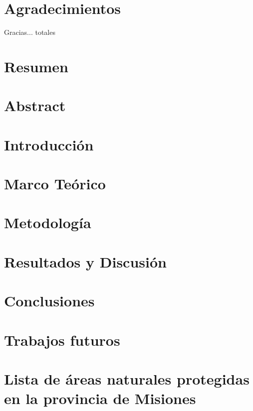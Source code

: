 \documentclass[11pt,a4paper]{report}
\begin{document}
\chapter*{Agradecimientos}
Gracias... totales
\chapter*{Resumen}  %

\chapter*{Abstract} %


\justifying
\setlength{\parindent}{20pt}
\chapter{Introducción}  
    
\chapter{Marco Teórico}
    
\chapter{Metodología}               \label{Metodología}
    
\chapter{Resultados y Discusión}    \label{Resultados}
    
\chapter{Conclusiones}      
    
\chapter{Trabajos futuros}      
    
\appendix
\chapter{Lista de áreas naturales protegidas en la provincia de Misiones} \label{reservas}

\end{document}
